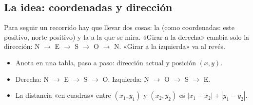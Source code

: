 \providecommand{\cubito}[3]{%
  \begin{scope}[shift={(#1*0.866-#2*0.866,#1*0.5+#2*0.5+#3)}]
    \filldraw[fill=zlime!55,draw=zink,line width=.4pt] (0,0) -- (0.866,0.5) -- (0,1) -- (-0.866,0.5) -- cycle;
  \end{scope}}
\providecommand{\cubo}[3]{%
  \begin{scope}[shift={({(#1-#2)*0.866},{(#1+#2)*0.5+#3})}]
    \filldraw[fill=zlime!60,draw=zink,line width=.4pt] (0,1) -- (0.866,1.5) -- (0,2) -- (-0.866,1.5) -- cycle;
    \filldraw[fill=zlime!25,draw=zink,line width=.4pt] (0,0) -- (0,1) -- (-0.866,1.5)++(0,0) -- (-0.866,0.5) -- cycle;
    \filldraw[fill=zolive!35,draw=zink,line width=.4pt] (0,0) -- (0.866,0.5) -- (0.866,1.5) -- (0,1) -- cycle;
  \end{scope}}


\subsection{La idea: coordenadas y dirección}
Para seguir un recorrido hay que llevar dos cosas: la  (como coordenadas: este positivo, norte positivo) y
la  a la que se mira. «Girar a la derecha» cambia solo la dirección:
N $\to$ E $\to$ S $\to$ O $\to$ N. «Girar a la izquierda» va al revés.


\begin{regla}
\begin{itemize}
  \item Anota en una tabla, paso a paso: dirección actual y posición $(x, y)$.
  \item Derecha: N $\to$ E $\to$ S $\to$ O. Izquierda: N $\to$ O $\to$ S $\to$ E.
  \item La distancia «en cuadras» entre $(x_1, y_1)$ y $(x_2, y_2)$ es $|x_1 - x_2| + |y_1 - y_2|$.
\end{itemize}
\end{regla}

